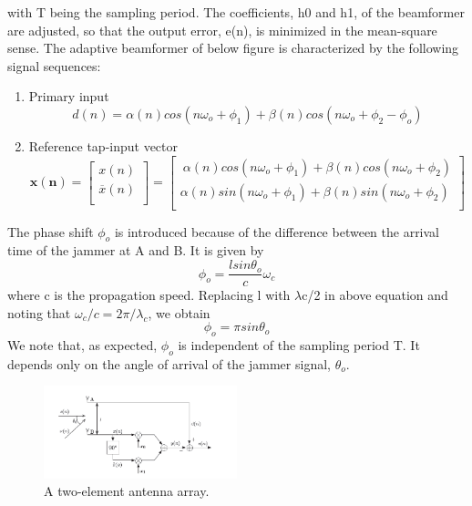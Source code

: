 with T being the sampling period. The coefficients, h0 and h1, of the beamformer are
adjusted, so that the output error, e(n), is minimized in the mean-square sense.
The adaptive beamformer of below figure is characterized by the
following signal sequences:
\begin{enumerate}
\item Primary input
$$d(n) = \alpha(n) cos(n\omega_o + \phi_1) + \beta(n) cos(n\omega_o + \phi_2 − \phi_o) $$

\item Reference tap-input vector
\[
\mathbf{x(n)}=
  \begin{bmatrix}
    x(n) \\
    \overline{x}(n) \\
  \end{bmatrix}
   =
  \begin{bmatrix}
    \ \alpha(n) cos(n\omega_o + \phi_1) + \beta(n) cos(n\omega_o + \phi_2) \\
    \alpha(n) sin(n\omega_o + \phi_1) + \beta(n) sin(n\omega_o + \phi_2)\\
   
  \end{bmatrix}
\]

\end{enumerate}

The phase shift $\phi_o$ is introduced because of the difference between the arrival time of the
jammer at A and B. It is given by
$$\phi_o= \dfrac{l sin \theta_o}{c}\omega_c$$ 
where c is the propagation speed. Replacing l with $\lambda$c/2 in above equation and noting that
$\omega_c / c = 2\pi/ \lambda_c$, we obtain
$$\phi_o = \pi sin \theta_o$$
We note that, as expected, $\phi_o$ is independent of the sampling period T. It depends only
on the angle of arrival of the jammer signal, $\theta_o$.

\begin{figure}[!ht]
\centering
\includegraphics[width=0.5\textwidth]{antenna_array.png}
\caption{\label{fig:antenna_array}A two-element antenna array.}
\end{figure}

